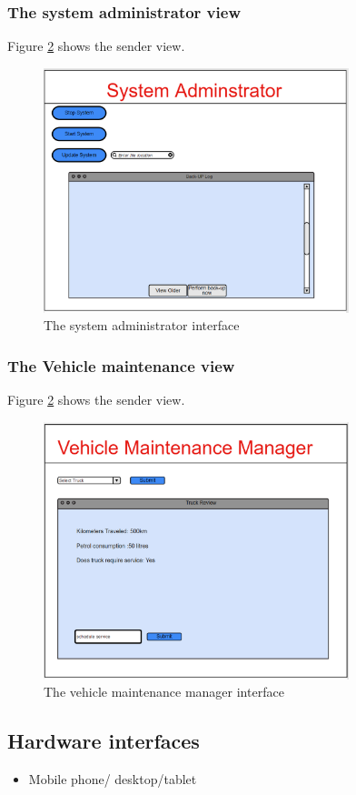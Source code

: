 \documentclass[paper=a4, fontsize=11pt]{scrartcl} %
\numberwithin{equation}{section} %
\numberwithin{figure}{section} %
\numberwithin{table}{section} %
\begin{document}
\subsubsection{The system administrator view}
Figure \ref{Sender} shows the sender view.
\begin{figure}[h!]
\centering
\includegraphics[width=3.5in]{pictures/admin.png}
\caption{The system administrator interface}
\label{Sender}
\end{figure}

\subsubsection{The Vehicle maintenance view}
Figure \ref{Sender} shows the sender view.
\begin{figure}[h!]
\centering
\includegraphics[width=3.5in]{pictures/vehicle.png}
\caption{The vehicle maintenance manager interface}
\label{Sender}
\end{figure}

\subsection{Hardware interfaces}
\begin{itemize}
			\item Mobile phone/ desktop/tablet
\end{itemize}
\end{document}
